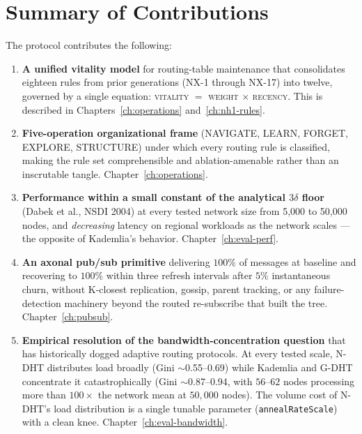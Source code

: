 \documentclass[twoside,nobib]{tufte-book}
\newcommand{\NDHT}{N-DHT\xspace}
\newcommand{\GDHT}{G-DHT\xspace}
\begin{document}
\section{Summary of Contributions}

The protocol contributes the following:

\begin{enumerate}
\item \textbf{A unified vitality model} for routing-table
maintenance that consolidates eighteen rules from prior generations
(NX-1 through NX-17) into twelve, governed by a single equation:
\textsc{vitality} $=$ \textsc{weight} $\times$ \textsc{recency}.
This is described in Chapters~\ref{ch:operations}
and~\ref{ch:nh1-rules}.

\item \textbf{Five-operation organizational frame} (NAVIGATE, LEARN,
FORGET, EXPLORE, STRUCTURE) under which every routing rule is
classified, making the rule set comprehensible and ablation-amenable
rather than an inscrutable tangle. Chapter~\ref{ch:operations}.

\item \textbf{Performance within a small constant of the analytical
$3\delta$ floor} (Dabek et al., NSDI 2004) at every tested network
size from 5{,}000 to 50{,}000 nodes, and \emph{decreasing} latency
on regional workloads as the network scales --- the opposite of
Kademlia's behavior. Chapter~\ref{ch:eval-perf}.

\item \textbf{An axonal pub/sub primitive} delivering $100\%$ of
messages at baseline and recovering to $100\%$ within three refresh
intervals after $5\%$ instantaneous churn, without K-closest
replication, gossip, parent tracking, or any failure-detection
machinery beyond the routed re-subscribe that built the tree.
Chapter~\ref{ch:pubsub}.

\item \textbf{Empirical resolution of the bandwidth-concentration
question} that has historically dogged adaptive routing protocols.
At every tested scale, \NDHT distributes load broadly (Gini
$\sim$0.55--0.69) while Kademlia and \GDHT concentrate it
catastrophically (Gini $\sim$0.87--0.94, with $56$--$62$ nodes
processing more than $100\times$ the network mean at $50{,}000$
nodes). The volume cost of \NDHT's load distribution is a single
tunable parameter (\texttt{annealRateScale}) with a clean knee.
Chapter~\ref{ch:eval-bandwidth}.


\end{enumerate}
\end{document}
